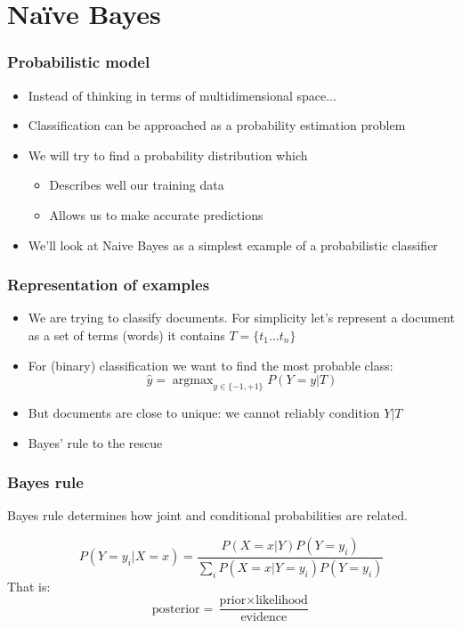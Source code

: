 \documentclass[14pt,mathserif]{beamer}
\DeclareMathOperator*{\argmax}{argmax}
\begin{document}
\section{Na{\"i}ve Bayes}
\begin{frame}
  \frametitle{Probabilistic model}
  \begin{itemize}
  \item Instead of thinking in terms of multidimensional space...
  \item Classification can be approached as a probability estimation problem
  \item We will try to find a probability distribution which
    \begin{itemize}
    \item  Describes
    well our training data 
  \item Allows us  to make accurate predictions 
    \end{itemize}
  \item We'll look at Naive Bayes as a simplest example of a
    probabilistic classifier
  \end{itemize}
\end{frame}


\begin{frame}
  \frametitle{Representation of examples}
  \begin{itemize}
    \item We are trying to classify documents. For simplicity let's
    represent a document as a set of terms (words) it contains $T =
    \{t_1...t_n\}$
  \item For (binary) classification we want to find the most probable class:
    \[ \hat{y} = \argmax_{y \in \{-1,+1\}} P(Y=y|T) \]
  \item But documents are close to unique: we cannot reliably
    condition $Y|T$
  \item Bayes' rule to the rescue
  \end{itemize}
\end{frame}


\begin{frame}
  \frametitle{Bayes rule} Bayes rule determines how joint and
  conditional probabilities are related.
 
  \begin{block}{}
\[
P(Y=y_i|X=x) = \frac{P(X=x|Y) P(Y=y_i)}{\sum_i P(X=x|Y=y_i)
  P(Y=y_i)}
\]
That is:
\[
\mbox{posterior} = \frac{\mbox{prior} \times \mbox{likelihood}}{\mbox{evidence}}
\]
\end{block}
\end{frame}
\end{document}
